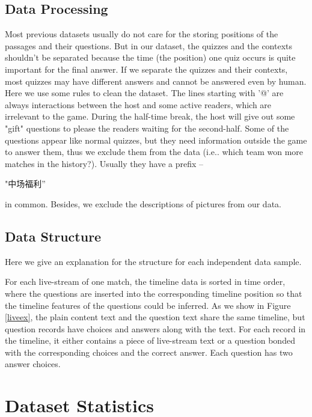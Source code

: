 \subsection{Data Processing}
 Most previous datasets usually do not care for the storing positions of the passages and their questions.
 But in our dataset, the quizzes and the contexts shouldn't be separated because the time (the position) one quiz occurs is quite important for the final answer. If we separate the quizzes and their contexts, 
 most quizzes may have different answers and cannot be answered even by human.
 Here we use some rules to clean the dataset. 
 The lines starting with '@' are always interactions between the host and some active readers, which are irrelevant to the game. During the half-time break, the host will give out some "gift" questions to please the readers waiting for the second-half. 
 Some of the questions appear like normal quizzes, but they need information outside the game to answer them, thus we exclude them from the data (i.e.. which team won more matches in the history?). Usually they have a prefix -- \begin{CJK}{UTF8}{gbsn}"中场福利”\end{CJK}  in common. Besides, we exclude the descriptions of pictures from our data. 
 
 \subsection{Data Structure}
 
 Here we give an explanation for the structure for each independent data sample.
 
 For each live-stream of one match, the timeline data is sorted in time order, where the questions are inserted into the corresponding timeline position so that the timeline features of the questions could be inferred. As we show in Figure \ref{liveex}, the plain content text and the question text share the same timeline, but question records have choices and answers along with the text. For each record in the timeline, it either contains a piece of live-stream text or a question bonded with the corresponding choices and the correct answer.
 Each question has two answer choices.
 

\section{Dataset Statistics}

